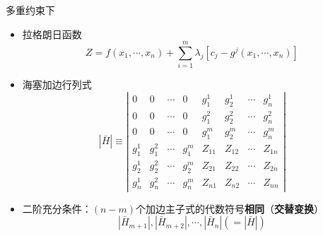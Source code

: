\documentclass[12pt, a4paper, oneside]{article}
\begin{document}
\begin{CJK*}{UTF8}{gbsn}
\noindent
多重约束下
\begin{itemize}
	\item 拉格朗日函数
	$$
	Z=f\left(x_{1}, \cdots, x_{n}\right)+\sum_{i=1}^{m} \lambda_{j}\left[c_{j}-g^{j}\left(x_{1}, \cdots, x_{n}\right)\right]
	$$
	\item 海塞加边行列式
	$$
	|\bar{H}| \equiv
	\left|\begin{array}{cccccccc}0 & 0 & \cdots & 0 & g_{1}^{1} & g_{2}^{1} & \cdots & g_{n}^{1} \\ 0 & 0 & \cdots & 0 & g_{1}^{2} & g_{2}^{2} & \cdots & g_{n}^{2} \\  0 & 0 & \cdots & 0 & g_{1}^{m} & g_{2}^{m} & \cdots & g_{n}^{m} \\  g_{1}^{1} & g_{1}^{2} & \cdots & g_{1}^{m} & Z_{11} & Z_{12} & \cdots & Z_{1 n} \\ g_{2}^{1} & g_{2}^{2} & \cdots & g_{2}^{m} & Z_{21} & Z_{22} & \cdots & Z_{2 n} \\  g_{n}^{1} & g_{n}^{2} & \cdots & g_{n}^{m} & Z_{n 1} & Z_{n 2} & \cdots & Z_{n n}\end{array} \right|
	$$	
	\item 二阶充分条件：$(n-m)$个加边主子式的代数符号\textbf{相同}（\textbf{交替变换}）
	$$\left|\bar{H}_{m+1}\right|,\left|\bar{H}_{m+2}\right|, \cdots,\left|\bar{H}_{n}\right|(=|\bar{H}|)$$
\end{itemize}

%

\end{CJK*}
\end{document}
